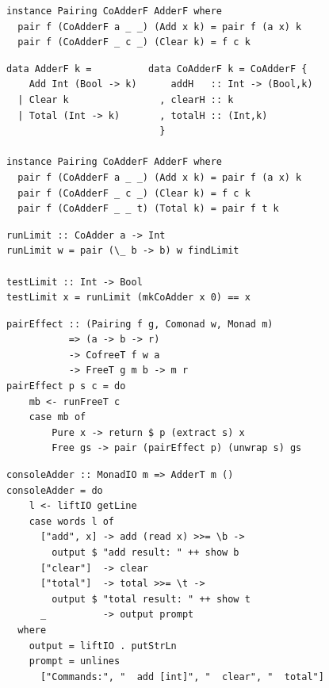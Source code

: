 \documentclass{beamer}
\begin{document}
\begin{frame}[fragile]
\begin{overprint}
\begin{verbatim}
instance Pairing CoAdderF AdderF where
  pair f (CoAdderF a _ _) (Add x k) = pair f (a x) k
  pair f (CoAdderF _ c _) (Clear k) = f c k

  \end{verbatim}
  \begin{verbatim}
data AdderF k =          data CoAdderF k = CoAdderF {
    Add Int (Bool -> k)      addH   :: Int -> (Bool,k)
  | Clear k                , clearH :: k
  | Total (Int -> k)       , totalH :: (Int,k)
                           }

instance Pairing CoAdderF AdderF where
  pair f (CoAdderF a _ _) (Add x k) = pair f (a x) k
  pair f (CoAdderF _ c _) (Clear k) = f c k
  pair f (CoAdderF _ _ t) (Total k) = pair f t k
  \end{verbatim}
  \end{overprint}
\end{frame}


\begin{frame}[fragile]
  \begin{verbatim}
runLimit :: CoAdder a -> Int
runLimit w = pair (\_ b -> b) w findLimit

testLimit :: Int -> Bool
testLimit x = runLimit (mkCoAdder x 0) == x
  \end{verbatim}
\end{frame}

\begin{frame}[fragile]
  \begin{verbatim}
pairEffect :: (Pairing f g, Comonad w, Monad m)
           => (a -> b -> r)
           -> CofreeT f w a
           -> FreeT g m b -> m r
pairEffect p s c = do
    mb <- runFreeT c
    case mb of
        Pure x -> return $ p (extract s) x
        Free gs -> pair (pairEffect p) (unwrap s) gs
  \end{verbatim}
\end{frame}

\begin{frame}[fragile]
  \begin{verbatim}
consoleAdder :: MonadIO m => AdderT m ()
consoleAdder = do
    l <- liftIO getLine
    case words l of
      ["add", x] -> add (read x) >>= \b ->
        output $ "add result: " ++ show b
      ["clear"]  -> clear
      ["total"]  -> total >>= \t ->
        output $ "total result: " ++ show t
      _          -> output prompt
  where
    output = liftIO . putStrLn
    prompt = unlines
      ["Commands:", "  add [int]", "  clear", "  total"]
  \end{verbatim}
\end{frame}
\end{document}
